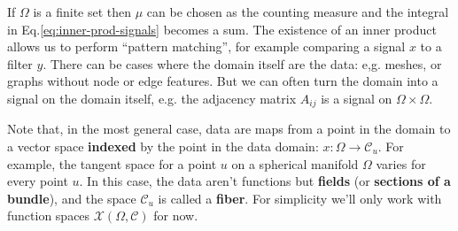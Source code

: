 \documentclass[11pt]{article}
\numberwithin{equation}{section}
\begin{document}
If $\Omega$ is a finite set then $\mu$ can be chosen as the counting measure and the integral in Eq.\eqref{eq:inner-prod-signals} becomes a sum. The existence of an inner product allows us to perform ``pattern matching'', for example comparing a signal $x$ to a filter $y$. There can be cases where the domain itself are the data: e,g. meshes, or graphs without node or edge features. But we can often turn the domain into a signal on the domain itself, e.g. the adjacency matrix $A_{ij}$ is a signal on $\Omega \times \Omega$.

Note that, in the most general case, data are maps from a point in the domain to a vector space \textbf{indexed} by the point in the data domain: $x: \Omega \rightarrow \mathcal{C}_u$. For example, the tangent space for a point $u$ on a spherical manifold $\Omega$ varies for every point $u$. In this case, the data aren't functions but \textbf{fields} (or \textbf{sections of a bundle}), and the space $\mathcal{C}_u$ is called a \textbf{fiber}. For simplicity we'll only work with function spaces $\mathcal{X}(\Omega, \mathcal{C})$ for now.

\newpage
 
\end{document}
